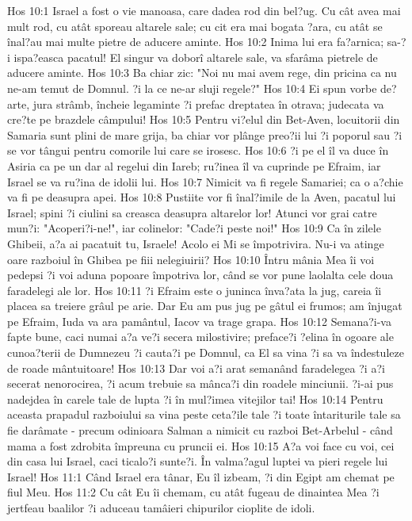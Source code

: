 Hos 10:1  Israel a fost o vie manoasa, care dadea rod din bel?ug. Cu cât avea mai mult rod, cu atât sporeau altarele sale; cu cit era mai bogata ?ara, cu atât se înal?au mai multe pietre de aducere aminte.
Hos 10:2  Inima lui era fa?arnica; sa-?i ispa?easca pacatul! El singur va doborî altarele sale, va sfarâma pietrele de aducere aminte.
Hos 10:3  Ba chiar zic: "Noi nu mai avem rege, din pricina ca nu ne-am temut de Domnul. ?i la ce ne-ar sluji regele?"
Hos 10:4  Ei spun vorbe de?arte, jura strâmb, încheie legaminte ?i prefac dreptatea în otrava; judecata va cre?te pe brazdele câmpului!
Hos 10:5  Pentru vi?elul din Bet-Aven, locuitorii din Samaria sunt plini de mare grija, ba chiar vor plânge preo?ii lui ?i poporul sau ?i se vor tângui pentru comorile lui care se irosesc.
Hos 10:6  ?i pe el îl va duce în Asiria ca pe un dar al regelui din Iareb; ru?inea îl va cuprinde pe Efraim, iar Israel se va ru?ina de idolii lui.
Hos 10:7  Nimicit va fi regele Samariei; ca o a?chie va fi pe deasupra apei.
Hos 10:8  Pustiite vor fi înal?imile de la Aven, pacatul lui Israel; spini ?i ciulini sa creasca deasupra altarelor lor! Atunci vor grai catre mun?i: "Acoperi?i-ne!", iar colinelor: "Cade?i peste noi!"
Hos 10:9  Ca în zilele Ghibeii, a?a ai pacatuit tu, Israele! Acolo ei Mi se împotrivira. Nu-i va atinge oare razboiul în Ghibea pe fiii nelegiuirii?
Hos 10:10  Întru mânia Mea îi voi pedepsi ?i voi aduna popoare împotriva lor, când se vor pune laolalta cele doua faradelegi ale lor.
Hos 10:11  ?i Efraim este o juninca înva?ata la jug, careia îi placea sa treiere grâul pe arie. Dar Eu am pus jug pe gâtul ei frumos; am înjugat pe Efraim, Iuda va ara pamântul, Iacov va trage grapa.
Hos 10:12  Semana?i-va fapte bune, caci numai a?a ve?i secera milostivire; preface?i ?elina în ogoare ale cunoa?terii de Dumnezeu ?i cauta?i pe Domnul, ca El sa vina ?i sa va îndestuleze de roade mântuitoare!
Hos 10:13  Dar voi a?i arat semanând faradelegea ?i a?i secerat nenorocirea, ?i acum trebuie sa mânca?i din roadele minciunii. ?i-ai pus nadejdea în carele tale de lupta ?i în mul?imea vitejilor tai!
Hos 10:14  Pentru aceasta prapadul razboiului sa vina peste ceta?ile tale ?i toate întariturile tale sa fie darâmate - precum odinioara Salman a nimicit cu razboi Bet-Arbelul - când mama a fost zdrobita împreuna cu pruncii ei.
Hos 10:15  A?a voi face cu voi, cei din casa lui Israel, caci ticalo?i sunte?i. În valma?agul luptei va pieri regele lui Israel!
Hos 11:1  Când Israel era tânar, Eu îl izbeam, ?i din Egipt am chemat pe fiul Meu.
Hos 11:2  Cu cât Eu îi chemam, cu atât fugeau de dinaintea Mea ?i jertfeau baalilor ?i aduceau tamâieri chipurilor cioplite de idoli.
